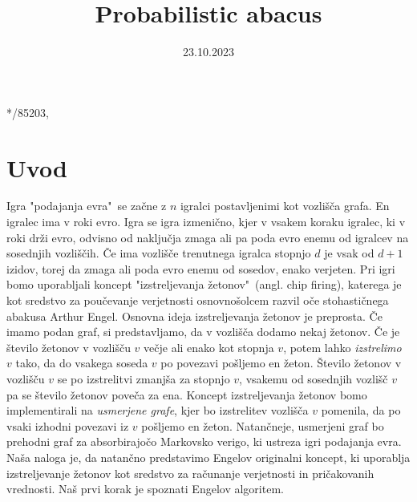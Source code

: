 \documentclass[twoside,11pt]{article}
\begin{document}



\date{23.10.2023}

\klasifikacija{~} 
\title{Probabilistic abacus}

\glava
\baselineskip=14.5pt

\smallskip**/85203,

\section{Uvod}
Igra "podajanja evra" \,se začne z $n$ igralci postavljenimi kot vozlišča grafa. En igralec ima v roki evro. Igra se igra izmenično, kjer v vsakem koraku igralec, ki v roki drži evro, odvisno od naključja zmaga ali pa poda evro enemu od igralcev na sosednjih vozliščih. Če ima vozlišče trenutnega igralca stopnjo $d$ je vsak od $d + 1$ izidov, torej da zmaga ali poda evro enemu od sosedov, enako verjeten. Pri igri bomo uporabljali koncept "izstreljevanja žetonov" \,(angl. chip firing), katerega je kot sredstvo za poučevanje verjetnosti osnovnošolcem razvil oče stohastičnega abakusa Arthur Engel.
Osnovna ideja izstreljevanja žetonov je preprosta. Če imamo podan graf, si predstavljamo, da v vozlišča dodamo nekaj žetonov. Če je število žetonov v vozlišču $v$ večje ali enako kot stopnja $v$, potem lahko \emph{izstrelimo} $v$ tako, da do vsakega soseda $v$ po povezavi pošljemo en žeton. Število žetonov v vozlišču $v$ se po izstrelitvi zmanjša za stopnjo $v$, vsakemu od sosednjih vozlišč $v$ pa se število žetonov poveča za ena. 
Koncept izstreljevanja žetonov bomo implementirali na \emph{usmerjene grafe}, kjer bo izstrelitev vozlišča $v$ pomenila, da po vsaki izhodni povezavi iz $v$ pošljemo en žeton. Natančneje, usmerjeni graf bo prehodni graf za absorbirajočo Markovsko verigo, ki ustreza igri podajanja evra. Naša naloga je, da natančno predstavimo Engelov originalni koncept, ki uporablja izstreljevanje žetonov kot sredstvo za računanje verjetnosti in pričakovanih vrednosti. Naš prvi korak je spoznati Engelov algoritem.
\end{document}

